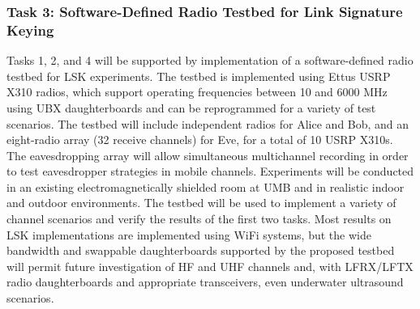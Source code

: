 \documentclass[12pt, titlepage]{article}
\begin{document}
\subsubsection*{Task 3: Software-Defined Radio Testbed for Link Signature Keying}
Tasks 1, 2, and 4 will be supported by implementation of a software-defined radio testbed for LSK experiments.  The testbed is implemented using Ettus USRP X310 radios, which support operating frequencies between 10 and 6000 MHz using UBX daughterboards and can be reprogrammed for a variety of test scenarios.  The testbed will include independent radios for Alice and Bob, and an eight-radio array (32 receive channels) for Eve, for a total of 10 USRP X310s.  The eavesdropping array will allow simultaneous multichannel recording in order to test eavesdropper strategies in mobile channels. Experiments will be conducted in an existing electromagnetically shielded room at UMB and in realistic indoor and outdoor environments.  The testbed will be used to implement a variety of channel scenarios  and verify the results of the first two tasks.  Most results on LSK implementations are implemented using WiFi systems, but the wide bandwidth and swappable daughterboards supported by the proposed testbed will permit future investigation of HF and UHF channels and, with LFRX/LFTX radio daughterboards and appropriate transceivers, even underwater ultrasound scenarios.
\end{document}
